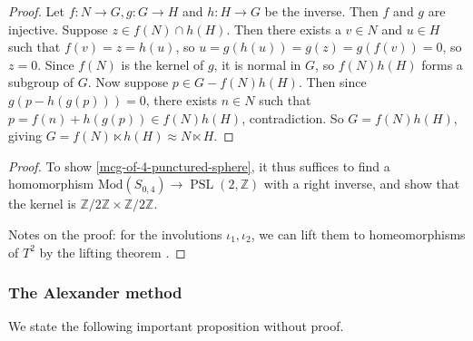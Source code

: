 \documentclass[reqno]{amsart}
\theoremstyle{definition}
\theoremstyle{remark}
\DeclareMathOperator{\PSL}{PSL}
\newcommand{\Mod}{{\mathrm{Mod}}}
\begin{document}
\begin{proof}
    Let $f \colon N \to G, g \colon G \to H$ and
    $h \colon H \to G$ be the inverse. Then
    $f$ and $g$ are injective. Suppose
    $z \in f(N) \cap h(H)$. Then there exists a
    $v \in N$ and $u \in H$ such that
    $f(v) = z = h(u)$, so 
    $u = g\left( h(u) \right) = g(z)
    = g(f(v)) = 0$, so $z = 0$.
    Since $f(N)$ is the kernel of $g$, it is
    normal in $G$, so $f(N) h(H)$ forms
    a subgroup of $G$. Now suppose
    $p \in G - f(N)h(H)$. Then since
    $g\left( p - h(g(p)) \right) = 0$, there
    exists $n \in N$ such that
    $p = f(n) + h(g(p)) \in f(N) h(H)$, contradiction.
    So $G = f(N) h(H)$, giving $G = f(N) \ltimes h(H)
    \approx N \ltimes H$.
\end{proof}

\begin{proof}
    To show \ref{mcg-of-4-punctured-sphere}, it
    thus suffices to find a homomorphism
    $\Mod \left( S_{0,4} \right) \to 
    \PSL \left( 2, \mathbb{Z} \right) $ with a right
    inverse, and show that the kernel
    is $\mathbb{Z} /2 \mathbb{Z} \times \mathbb{Z} / 2 \mathbb{Z}$.

    Notes on the proof: for the involutions
    $\iota_1, \iota_2$, we can lift them
    to homeomorphisms of $T^2$ by the lifting theorem
    \cite[Thm~4.1]{Bredon}.
\end{proof}


\subsubsection{The Alexander method}

We state the following important proposition without proof.
\end{document}
